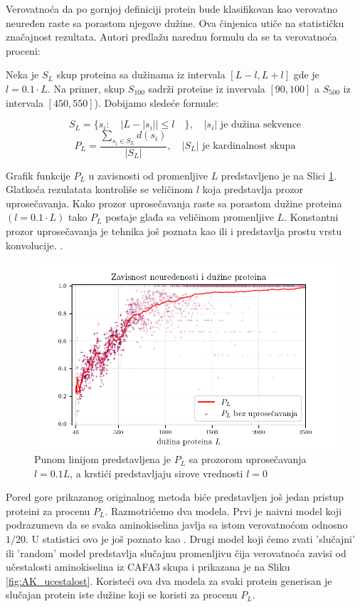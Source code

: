 Verovatnoća da po gornjoj definiciji protein bude klasifikovan kao verovatno
neuređen raste sa porastom njegove dužine. Ova činjenica  utiče
na statističku značajnost rezultata. Autori \parencite{Xie2007} 
predlažu narednu formulu da se ta verovatnoća proceni:

Neka je $S_L$ skup proteina sa dužinama iz intervala $[L-l, L+l]$ gde je $l
= 0.1 \cdot L$. Na primer, skup $S_{100}$ sadrži proteine iz invervala $[90, 100]$ a $S_{500}$ iz intervala $[450, 550]$).
Dobijamo sledeće formule:

$$ S_L = \{s_i : \quad | L -  | s_i | | \le l \quad \}, \quad   |s_i| \text{ je dužina sekvence}  $$
$$ P_L = \dfrac{ \sum_{s_i \in S_L} d(s_i)} {| S_L |}, \quad   |S_L| \text{ je kardinalnost skupa}$$

Grafik funkcije $P_L$ u zavisnosti od promenljive $L$ predstavljeno je na Slici
\ref{fig:PL1}.  Glatkoća rezulatata kontroliše se veličinom $l$ koja
predstavlja prozor uprosečavanja. Kako prozor uprosečavanja raste sa porastom
dužine proteina $(l = 0.1 \cdot L)$ tako $P_L$ postaje glađa sa veličinom
promenljive $L$.  Konstantni prozor uprosečavanja je tehnika još poznata
kao  ili  i predstavlja prostu vrstu
konvolucije.  .


\begin{figure}[th]
\centering
\includegraphics[]{plots/PL_F}
\decoRule
\caption {
 Punom linijom predstavljena je $P_L$ sa prozorom uprosečavanja $l = 0.1L$,
 a krstići predstavljaju sirove vrednosti $l = 0$ 
}
\label{fig:PL1}
\end{figure}


Pored gore prikazanog originalnog metoda biće predstavljen još jedan pristup
  proteini za procenu $P_L$.
Razmotrićemo dva modela. Prvi je naivni model 
koji podrazumeva da se svaka aminokiselina javlja sa istom verovatnoćom odnosno
$1/20$. U statistici ovo je još poznato kao .  Drugi
model koji ćemo zvati 'slučajni' ili 'random' model predstavlja slučajnu
promenljivu čija verovatnoća zavisi od učestalosti aminokiselina iz CAFA3 skupa
i prikazana je na Sliku \ref{fig:AK_ucestalost}.  Koristeći ova dva modela za
svaki protein generisan je slučajan protein iste dužine koji se koristi za
procenu $P_L$.


